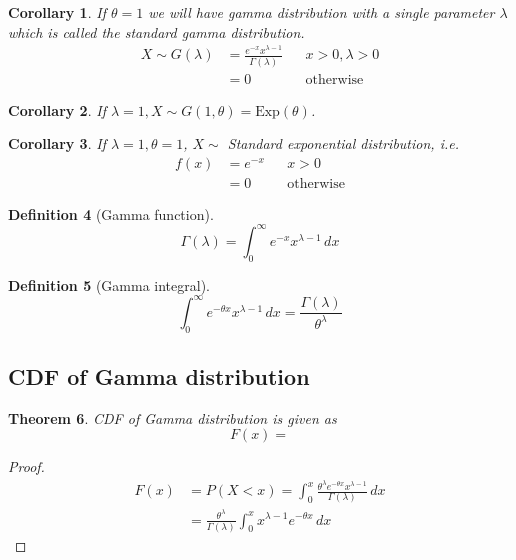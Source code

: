 \documentclass[oneside,11pt,pdftex]{book}%
\numberwithin{equation}{section}
\newtheorem{theorem}{Theorem}[chapter]%
\newtheorem{corollary}[theorem]{Corollary}
\newtheorem{definition}[theorem]{Definition}
\numberwithin{section}{chapter}
\numberwithin{equation}{chapter}
\begin{document}
\begin{corollary}
	If $ \theta=1 $ we will have gamma distribution with a single parameter $ \lambda $ which is called the standard gamma distribution.
	\begin{align*}
		X\sim G(\lambda)&= \frac{e^{-x} x^{\lambda -1}}{\Gamma (\lambda )} && x>0, \lambda >0\\
		&=0 && \text{otherwise}
	\end{align*}
\end{corollary}

\begin{corollary}
	If $ \lambda=1, X \sim G(1, \theta) = \text{Exp}(\theta)$.
\end{corollary}

\begin{corollary}
	If $ \lambda=1, \theta=1 $, $ X \sim  $ Standard exponential distribution, i.e.
	\begin{align*}
		f(x)&= e^{-x} && x>0\\
		&=0 && \text{otherwise}
	\end{align*}
\end{corollary}


\begin{definition}[Gamma function]
	\[ \Gamma(\lambda) =\int_0^\infty e^{-x} x^{\lambda -1 }\, dx \]
\end{definition}

\begin{definition}[Gamma integral]
	\[ \int_0^\infty e^{- \theta x} x^{\lambda -1}\, dx = \frac{\Gamma (\lambda)}{\theta^\lambda}\]
\end{definition}

\subsection{CDF of Gamma distribution}
\begin{theorem}
 	CDF of Gamma distribution is given as \[ F(x) = \]
\end{theorem}
\begin{proof}
	\begin{align*}
		F(x)&=P(X<x)=\int_0^x \frac{\theta ^\lambda e^{- \theta x} x^{\lambda -1}}{\Gamma (\lambda )}\, dx\\
		&=\frac{\theta^{\lambda}}{\Gamma(\lambda)} \int_0^x x^{\lambda-1} e^{-\theta x}\, dx
	\end{align*}
\end{proof}
\end{document}

